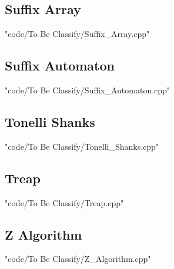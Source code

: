 \documentclass [landscape,8pt,a4paper,twocolumn]{article}
\begin{document}
\subsection{Suffix Array}
 {"code/To Be Classify/Suffix_Array.cpp"}
\subsection{Suffix Automaton}
 {"code/To Be Classify/Suffix_Automaton.cpp"}
\subsection{Tonelli Shanks}
 {"code/To Be Classify/Tonelli_Shanks.cpp"}
\subsection{Treap}
 {"code/To Be Classify/Treap.cpp"}
\subsection{Z Algorithm}
 {"code/To Be Classify/Z_Algorithm.cpp"}

\end{document}
